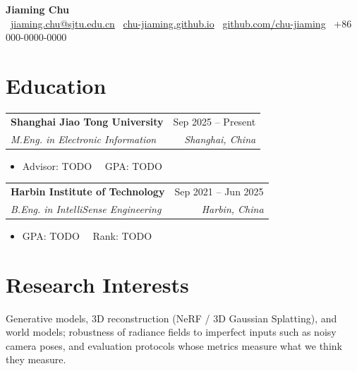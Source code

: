 \documentclass[a4paper,10pt]{article}
\makeatletter
\newcommand{\entry}[4]{%
  \begin{tabularx}{\linewidth}{@{}X r@{}}
    \textbf{#1} & #2 \\
    \textit{\small #3} & \textit{\small\color{subtle} #4} \\
  \end{tabularx}\vspace{-3pt}}
\newcommand{\pub}[4]{\item #1. \textbf{#2}. \textit{#3}. {\small #4}}
\newcommand{\me}{\underline{Jiaming Chu}}
\newcommand{\sep}{\ \textbar\ }
\makeatother
\begin{document}
\begin{center}
  {\Huge\bfseries Jiaming Chu}\\[4pt]
  \small
  \faEnvelope\ \href{mailto:jiaming.chu@sjtu.edu.cn}{jiaming.chu@sjtu.edu.cn}\quad
  \faGlobe\ \href{https://chu-jiaming.github.io}{chu-jiaming.github.io}\quad
  \faGithub\ \href{https://github.com/chu-jiaming}{github.com/chu-jiaming}\quad
  \faPhone\ +86 000-0000-0000 %
\end{center}
\vspace{-6pt}

\section{Education}
\entry{Shanghai Jiao Tong University}{Sep 2025 -- Present}
      {M.Eng. in Electronic Information}{Shanghai, China}
\begin{itemize}
  \item Advisor: TODO \sep GPA: TODO %
\end{itemize}

\vspace{3pt}
\entry{Harbin Institute of Technology}{Sep 2021 -- Jun 2025} %
      {B.Eng. in IntelliSense Engineering}{Harbin, China}
\begin{itemize}
  \item GPA: TODO \sep Rank: TODO %
\end{itemize}

\section{Research Interests}
Generative models, 3D reconstruction (NeRF / 3D Gaussian Splatting), and world models;
robustness of radiance fields to imperfect inputs such as noisy camera poses, and
evaluation protocols whose metrics measure what we think they measure.

\end{document}
